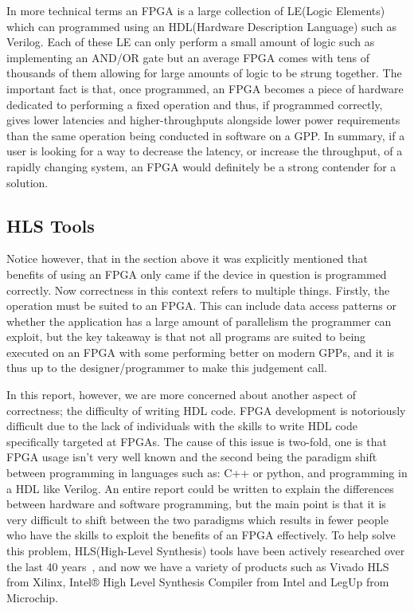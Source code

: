 In more technical terms an FPGA is a large collection of LE(Logic Elements) which can programmed using an HDL(Hardware Description Language) such as Verilog. Each of these LE can only perform a small amount of logic such as implementing an AND/OR gate but an average FPGA comes with tens of thousands of them allowing for large amounts of logic to be strung together. The important fact is that, once programmed, an FPGA becomes a piece of hardware dedicated to performing a fixed operation and thus, if programmed correctly, gives lower latencies and higher-throughputs alongside lower power requirements than the same operation being conducted in software on a GPP. In summary, if a user is looking for a way to decrease the latency, or increase the throughput, of a rapidly changing system, an FPGA would definitely be a strong contender for a solution. 

\subsection{HLS Tools}

Notice however, that in the section above it was explicitly mentioned that benefits of using an FPGA only came if the device in question is programmed correctly. Now correctness in this context refers to multiple things. Firstly, the operation must be suited to an FPGA. This can include data access patterns or whether the application has a large amount of parallelism the programmer can exploit, but the key takeaway is that not all programs are suited to being executed on an FPGA with some performing better on modern GPPs, and it is thus up to the designer/programmer to make this judgement call.

In this report, however, we are more concerned about another aspect of correctness; the difficulty of writing HDL code. FPGA development is notoriously difficult due to the lack of individuals with the skills to write HDL code specifically targeted at FPGAs. The cause of this issue is two-fold, one is that FPGA usage isn't very well known and the second being the paradigm shift between programming in languages such as: C++ or python, and programming in a HDL like Verilog. An entire report could be written to explain the differences between hardware and software programming, but the main point is that it is very difficult to shift between the two paradigms which results in fewer people who have the skills to exploit the benefits of an FPGA effectively. To help solve this problem, HLS(High-Level Synthesis) tools have been actively researched over the last 40 years~\cite{5209959}, and now we have a variety of products such as Vivado HLS from Xilinx, Intel® High Level Synthesis Compiler from Intel and LegUp from Microchip.

